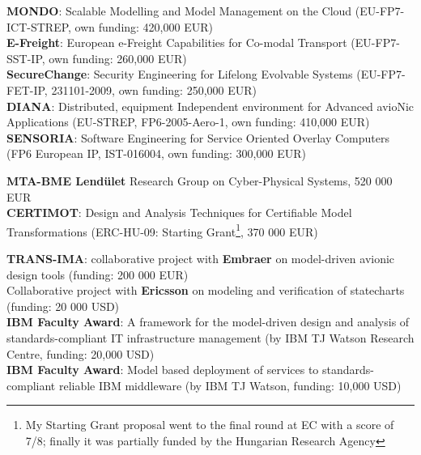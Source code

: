 \documentclass{xetexCV}
\begin{document}
\textbf{MONDO}:  Scalable Modelling and Model Management 
on the Cloud (EU-FP7-ICT-STREP, own funding: 420,000 EUR)  \\
\textbf{E-Freight}: European e-Freight Capabilities for
Co-modal Transport (EU-FP7-SST-IP, own funding: 260,000 EUR)  \\
\textbf{SecureChange}: Security Engineering for Lifelong
Evolvable Systems (EU-FP7-FET-IP, 231101-2009, own funding: 250,000 EUR)  \\ 
\textbf{DIANA}: Distributed, equipment Independent
environment for Advanced avioNic Applications (EU-STREP, FP6-2005-Aero-1, own funding: 410,000 EUR) \\
\textbf{SENSORIA}: Software Engineering for Service Oriented
Overlay Computers (FP6 European IP, IST-016004, own funding: 300,000 EUR)  



\textbf{MTA-BME Lend\"ulet}  Research Group on Cyber-Physical Systems, 520 000 EUR\\

\textbf{CERTIMOT}: Design and Analysis Techniques for
Certifiable Model Transformations (ERC-HU-09: Starting Grant\footnote{My
Starting Grant proposal went to the final round at EC with a score of 7/8;
finally it was partially funded by the Hungarian Research Agency}, 370 000 EUR) 



\textbf{TRANS-IMA}: collaborative project with \textbf{Embraer} on
model-driven avionic design tools (funding: 200 000 EUR) \\

Collaborative project with \textbf{Ericsson} on
modeling and verification of statecharts (funding: 20 000 USD)\\

\textbf{IBM Faculty Award}: A framework for the model-driven design
and analysis of standards-compliant IT infrastructure management (by IBM TJ Watson Research Centre,
funding: 20,000 USD)  \\

\textbf{IBM Faculty Award}: Model based deployment of services to
standards-compliant reliable IBM middleware (by IBM TJ Watson,
funding: 10,000 USD)  \\
\end{document}
